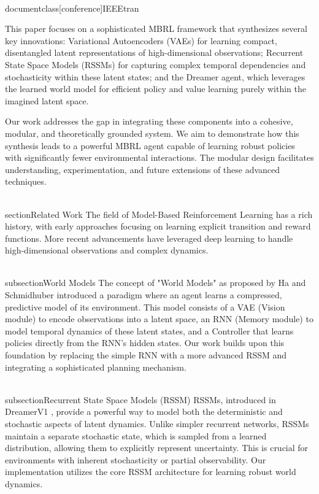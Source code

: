\\documentclass[conference]{IEEEtran}
\begin{document}
This paper focuses on a sophisticated MBRL framework that synthesizes several key innovations: Variational Autoencoders (VAEs) for learning compact, disentangled latent representations of high-dimensional observations; Recurrent State Space Models (RSSMs) for capturing complex temporal dependencies and stochasticity within these latent states; and the Dreamer agent, which leverages the learned world model for efficient policy and value learning purely within the imagined latent space.

Our work addresses the gap in integrating these components into a cohesive, modular, and theoretically grounded system. We aim to demonstrate how this synthesis leads to a powerful MBRL agent capable of learning robust policies with significantly fewer environmental interactions. The modular design facilitates understanding, experimentation, and future extensions of these advanced techniques.

\\section{Related Work}
The field of Model-Based Reinforcement Learning has a rich history, with early approaches focusing on learning explicit transition and reward functions. More recent advancements have leveraged deep learning to handle high-dimensional observations and complex dynamics.

\\subsection{World Models}
The concept of "World Models" as proposed by Ha and Schmidhuber \cite{ha2018worldmodels} introduced a paradigm where an agent learns a compressed, predictive model of its environment. This model consists of a VAE (Vision module) to encode observations into a latent space, an RNN (Memory module) to model temporal dynamics of these latent states, and a Controller that learns policies directly from the RNN's hidden states. Our work builds upon this foundation by replacing the simple RNN with a more advanced RSSM and integrating a sophisticated planning mechanism.

\\subsection{Recurrent State Space Models (RSSM)}
RSSMs, introduced in DreamerV1 \cite{hafner2019dreamer}, provide a powerful way to model both the deterministic and stochastic aspects of latent dynamics. Unlike simpler recurrent networks, RSSMs maintain a separate stochastic state, which is sampled from a learned distribution, allowing them to explicitly represent uncertainty. This is crucial for environments with inherent stochasticity or partial observability. Our implementation utilizes the core RSSM architecture for learning robust world dynamics.
\end{document}
